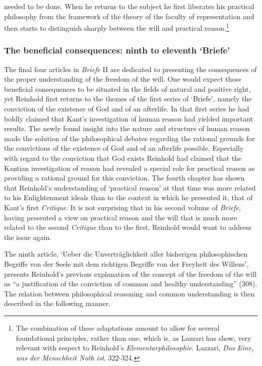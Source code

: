 needed to be done. When he returns to the subject he first liberates his practical philosophy from the framework of the theory of the faculty of representation and then starts to distinguish sharply between the will and practical reason.\footnote{ The combination of these adaptations amount to allow  for several foundational principles, rather than one, which is, as Lazzari has show, very relevant with respect to Reinhold's \textit{Elementarphilosophie}. Lazzari, \textit{Das Eine, was der Menschheit Noth ist}, 322{-}324.} 


\subsubsection{The beneficial consequences: ninth to eleventh `Briefe'}


The final four articles in \textit{Briefe} II are dedicated to presenting the consequences of the proper understanding of the freedom of the will. One would expect those beneficial consequences to be situated in the fields of natural and positive right, yet Reinhold first returns to the themes of the first series of `Briefe', namely the conviction of the existence of God and of an afterlife. In that first series he had boldly claimed that Kant's investigation of human reason had yielded important results. The newly found insight into the nature and structure of human reason made the solution of the philosophical debates regarding the rational grounds for the convictions of the existence of God and of an afterlife possible. Especially with regard to the conviction that God exists Reinhold had claimed that the Kantian investigation of reason had revealed a special role for practical reason as providing a rational ground for this conviction. The fourth chapter has shown that Reinhold's understanding of `practical reason' at that time was more related to his Enlightenment ideals than to the context in which he presented it, that of Kant's first \textit{Critique}. It is not surprising that in his second volume of \textit{Briefe}, having presented a view on practical reason and the will that is much more related to the second \textit{Critique} than to the first, Reinhold would want to address the issue again. 

 The ninth article, `Ueber die Unvertr\"{a}glichkeit aller bisherigen philosophischen Begriffe von der Seele mit dem richtigen Begriffe von der Freyheit des Willens', presents Reinhold's previous explanation of the concept of the freedom of the will as ``a justification of the conviction of common and healthy understanding'' (308). The relation between philosophical reasoning and common understanding is then described in the following manner. 

